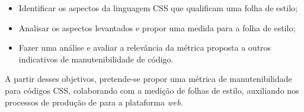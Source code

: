 \begin{itemize}
	\item Identificar os aspectos da linguagem CSS que qualificam uma folha de estilo;
	\item Analisar os aspectos levantados e propor uma medida para a folha de estilo;
	\item Fazer uma análise e avaliar a relevância da métrica proposta a outros indicativos de manutenibilidade de código.
\end{itemize}

A partir desses objetivos, pretende-se propor uma métrica de manutenibilidade para códigos CSS, colaborando com a medição de folhas de estilo, auxiliando nos processos de produção de para a plataforma \textit{web}.


